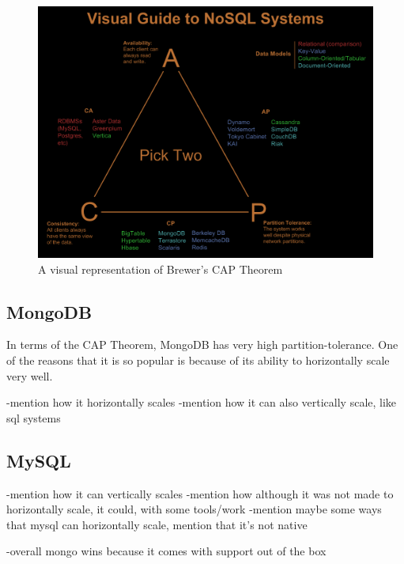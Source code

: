 \documentclass[12pt]{article}
\begin{document}
\begin{figure}
\begin{center}
        \includegraphics[scale=0.4]{resources/choose_two.png}
\end{center}
\caption{\label{figcaption} A visual representation of Brewer's CAP Theorem \cite{cap_picture}}
\end{figure}

\subsection{MongoDB}

In terms of the CAP Theorem, MongoDB has very high partition-tolerance. One of the reasons that it is so popular is because of its ability to horizontally scale very well.

-mention how it horizontally scales
-mention how it can also vertically scale, like sql systems

\subsection{MySQL}
-mention how it can vertically scales
-mention how although it was not made to horizontally scale, it could, with some tools/work
-mention maybe some ways that mysql can horizontally scale, mention that it's not native


-overall mongo wins because it comes with support out of the box
\end{document}
